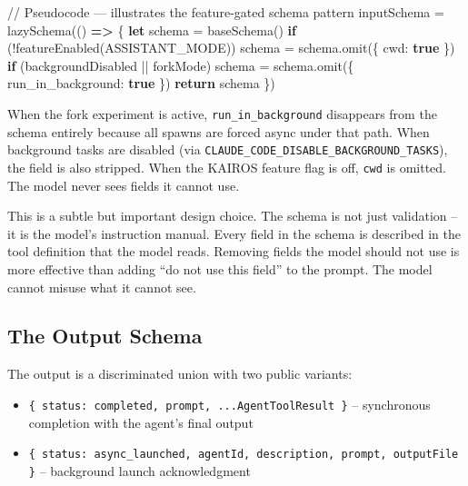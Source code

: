 \documentclass[
  english,
  11pt,
  letterpaper,
]{book}
\newenvironment{Shaded}{\begin{snugshade}}{\end{snugshade}}
\newcommand{\CommentTok}[1]{\textcolor[rgb]{0.37,0.37,0.37}{#1}}
\newcommand{\ControlFlowTok}[1]{\textcolor[rgb]{0.00,0.23,0.31}{\textbf{#1}}}
\newcommand{\FunctionTok}[1]{\textcolor[rgb]{0.28,0.35,0.67}{#1}}
\newcommand{\KeywordTok}[1]{\textcolor[rgb]{0.00,0.23,0.31}{\textbf{#1}}}
\newcommand{\NormalTok}[1]{\textcolor[rgb]{0.00,0.23,0.31}{#1}}
\newcommand{\OperatorTok}[1]{\textcolor[rgb]{0.37,0.37,0.37}{#1}}
\newcommand{\StringTok}[1]{\textcolor[rgb]{0.13,0.47,0.30}{#1}}
\providecommand{\tightlist}{%
  \setlength{\itemsep}{0pt}\setlength{\parskip}{0pt}}
\begin{document}
\begin{Shaded}
\begin{Highlighting}[]
\CommentTok{// Pseudocode — illustrates the feature{-}gated schema pattern}
\NormalTok{inputSchema }\OperatorTok{=} \FunctionTok{lazySchema}\NormalTok{(() }\KeywordTok{=\textgreater{}}\NormalTok{ \{}
  \KeywordTok{let}\NormalTok{ schema }\OperatorTok{=} \FunctionTok{baseSchema}\NormalTok{()}
  \ControlFlowTok{if}\NormalTok{ (}\OperatorTok{!}\FunctionTok{featureEnabled}\NormalTok{(}\StringTok{\textquotesingle{}ASSISTANT\_MODE\textquotesingle{}}\NormalTok{)) schema }\OperatorTok{=}\NormalTok{ schema}\OperatorTok{.}\FunctionTok{omit}\NormalTok{(\{ cwd}\OperatorTok{:} \KeywordTok{true}\NormalTok{ \})}
  \ControlFlowTok{if}\NormalTok{ (backgroundDisabled }\OperatorTok{||}\NormalTok{ forkMode)    schema }\OperatorTok{=}\NormalTok{ schema}\OperatorTok{.}\FunctionTok{omit}\NormalTok{(\{ run\_in\_background}\OperatorTok{:} \KeywordTok{true}\NormalTok{ \})}
  \ControlFlowTok{return}\NormalTok{ schema}
\NormalTok{\})}
\end{Highlighting}
\end{Shaded}

When the fork experiment is active, \texttt{run\_in\_background}
disappears from the schema entirely because all spawns are forced async
under that path. When background tasks are disabled (via
\texttt{CLAUDE\_CODE\_DISABLE\_BACKGROUND\_TASKS}), the field is also
stripped. When the KAIROS feature flag is off, \texttt{cwd} is omitted.
The model never sees fields it cannot use.

This is a subtle but important design choice. The schema is not just
validation -- it is the model's instruction manual. Every field in the
schema is described in the tool definition that the model reads.
Removing fields the model should not use is more effective than adding
``do not use this field'' to the prompt. The model cannot misuse what it
cannot see.

\subsection{The Output Schema}\label{the-output-schema}

The output is a discriminated union with two public variants:

\begin{itemize}
\tightlist
\item
  \texttt{\{\ status:\ \textquotesingle{}completed\textquotesingle{},\ prompt,\ ...AgentToolResult\ \}}
  -- synchronous completion with the agent's final output
\item
  \texttt{\{\ status:\ \textquotesingle{}async\_launched\textquotesingle{},\ agentId,\ description,\ prompt,\ outputFile\ \}}
  -- background launch acknowledgment
\end{itemize}
\end{document}
